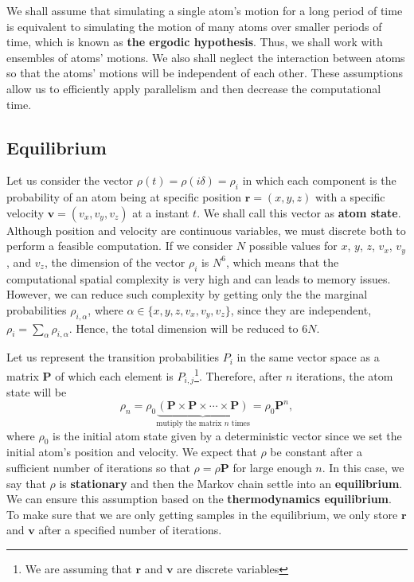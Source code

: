 We shall assume that simulating a single atom's motion for a long period of time is equivalent to simulating the motion of many atoms over smaller periods of time, which is known as \textbf{the ergodic hypothesis}. Thus, we shall work with ensembles of atoms' motions. We also shall neglect the interaction between atoms so that the atoms' motions will be independent of each other. These assumptions allow us to efficiently apply parallelism and then decrease the computational time.


\subsection{Equilibrium}
\label{sec:equilibrium}

Let us consider the vector $ \rho(t) = \rho(i\delta) = \rho_i $ in which each component is the probability of an atom being at specific position $ \mathbf{r} = (x, y, z) $ with a specific velocity $ \mathbf{v} = (v_x, v_y, v_z) $ at a instant $ t $.
We shall call this vector as \textbf{atom state}. Although position and velocity are continuous variables, we must discrete both to perform a feasible computation. If we consider $ N $ possible values for $ x $, $ y $, $ z $, $ v_x $, $ v_y $, and $ v_z $, the dimension of the vector $ \rho_i $ is $ N^6 $, which means that the computational spatial complexity is very high and can leads to memory issues. However, we can reduce such complexity by getting only the the marginal probabilities $ \rho_{i,\alpha} $, where $ \alpha \in \{x, y, z, v_x, v_y, v_z\} $, since they are independent, $ \rho_{i} = \sum_{\alpha} \rho_{i, \alpha} $. Hence, the total dimension will be reduced to $ 6N $.

Let us represent the transition probabilities $ P_i $ in the same vector space as a matrix $ \mathbf{P} $ of which each element is $ P_{i,j} $\footnote{We are assuming that $ \mathbf{r} $ and $ \mathbf{v} $ are discrete variables}. Therefore, after $ n $ iterations, the atom state will be \cite[Section~23.2]{wasserman2004all}
\begin{equation}
    \rho_n =  \rho_0 \underbrace{(\mathbf{P} \times \mathbf{P} \times \cdots \times \mathbf{P})}_{\textrm{mutiply the matrix $n$ times}} = \rho_0 \mathbf{P}^n,
\end{equation}
where $ \rho_0 $ is the initial atom state given by a deterministic vector since we set the initial atom's position and velocity. We expect that $ \rho $ be constant after a sufficient number of iterations so that $ \rho = \rho\mathbf{P} $ for large enough $ n $. In this case, we say that $ \rho $ is \textbf{stationary} and then the Markov chain settle into an \textbf{equilibrium}. We can ensure this assumption based on the \textbf{thermodynamics equilibrium}. To make sure that we are only getting samples in the equilibrium, we only store $ \mathbf{r} $ and $ \mathbf{v} $ after a specified number of iterations.

